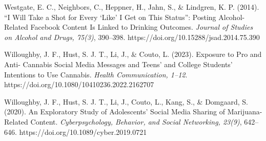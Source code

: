 \documentclass[
  letterpaper,
  DIV=11,
  numbers=noendperiod]{scrartcl}
\begin{document}
Westgate, E. C., Neighbors, C., Heppner, H., Jahn, S., \& Lindgren, K.
P. (2014). ``I Will Take a Shot for Every `Like' I Get on This Status'':
Posting Alcohol-Related Facebook Content Is Linked to Drinking Outcomes.
\emph{Journal of Studies on Alcohol and Drugs, 75(3)}, 390--398.
https://doi.org/10.15288/jsad.2014.75.390

Willoughby, J. F., Hust, S. J. T., Li, J., \& Couto, L. (2023). Exposure
to Pro and Anti- Cannabis Social Media Messages and Teens' and College
Students' Intentions to Use Cannabis. \emph{Health Communication,
1--12}. https://doi.org/10.1080/10410236.2022.2162707

Willoughby, J. F., Hust, S. J. T., Li, J., Couto, L., Kang, S., \&
Domgaard, S. (2020). An Exploratory Study of Adolescents' Social Media
Sharing of Marijuana-Related Content. \emph{Cyberpsychology, Behavior,
and Social Networking, 23(9)}, 642--646.
https://doi.org/10.1089/cyber.2019.0721
\end{document}
